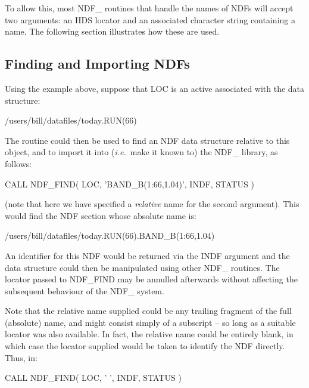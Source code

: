 \documentclass[twoside,11pt,nolof]{starlink}
\providecommand{\st}[1]{{\emph{#1}}}
\begin{document}
To allow this, most NDF\_ routines that handle the names of NDFs will
accept two arguments: an HDS locator and an associated character
string containing a name. The following section illustrates how these
are used.

\subsection{\label{ss:findingandimporting}Finding and Importing NDFs}

Using the example above, suppose that LOC is an active  associated with the data structure:

\small
\begin{terminalv}
      /users/bill/datafiles/today.RUN(66)
\end{terminalv}
\normalsize

The routine  could then be used to find an NDF data structure
relative to this object, and to import it into (\st{i.e.}\ make it
known to) the NDF\_ library, as follows:

\small
\begin{terminalv}
      CALL NDF_FIND( LOC, 'BAND_B(1:66,1.04)', INDF, STATUS )
\end{terminalv}
\normalsize

(note that here we have specified a \st{relative\/} name for the second
argument). This would find the NDF section whose absolute name is:

\small
\begin{terminalv}
      /users/bill/datafiles/today.RUN(66).BAND_B(1:66,1.04)
\end{terminalv}
\normalsize

An identifier for this NDF would be returned via the INDF argument and
the data structure could then be manipulated using other NDF\_
routines.  The locator passed to NDF\_FIND may be annulled afterwards
without affecting the subsequent behaviour of the NDF\_ system.

Note that the relative name supplied could be any trailing fragment of
the full (absolute) name, and might consist simply of a subscript --
so long as a suitable locator was also available. In fact, the
relative name could be entirely blank, in which case the locator
supplied would be taken to identify the NDF directly. Thus, in:

\small
\begin{terminalv}
      CALL NDF_FIND( LOC, ' ', INDF, STATUS )
\end{terminalv}
\normalsize
\end{document}
